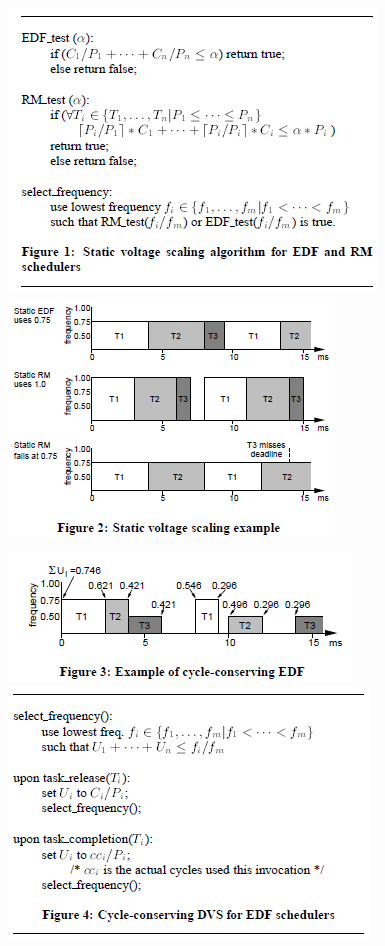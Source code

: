 \documentclass[11pt
  , a4paper
  , article
  , oneside
]{memoir}
\begin{document}
\appendix

\begin{figure}[h!]
	\centering
	\includegraphics{./images/fig01.png}
	\includegraphics{./images/fig02.png}
\end{figure}
\begin{figure}[h!]
	\centering
	\includegraphics{./images/fig03.png}
	\includegraphics{./images/fig04.png}
\end{figure}
\end{document}
